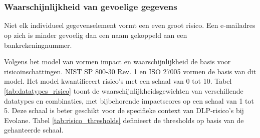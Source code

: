 

\section{}
\label{sec:data_risico}

\subsubsection{Waarschijnlijkheid van gevoelige gegevens}
Niet elk individueel gegevenselement vormt een even groot risico. Een e-mailadres op zich is minder gevoelig dan een naam gekoppeld aan een bankrekeningnummer. 


Volgens het model van \textcite{AlFikri2019} vormen impact en waarschijnlijkheid de basis voor risico\-inschattingen. 
NIST SP 800-30 Rev. 1 \autocite{NIST800-30} en ISO 27005 \autocite{IOSIEC2022} vormen de basis van dit model.
Het model kwantificeert risico's met een schaal van 0 tot 10. 
Tabel \ref{tab:datatypes_risico} toont de waarschijnlijkheidsgewichten van verschillende datatypes en combinaties, 
met bijbehorende impactscores op een schaal van 1 tot 5.
Deze schaal is beter geschikt voor de specifieke context van DLP-risico's bij Evolane.
Tabel \ref{tab:risico_thresholds} definieert de thresholds op basis van de gehanteerde schaal.

